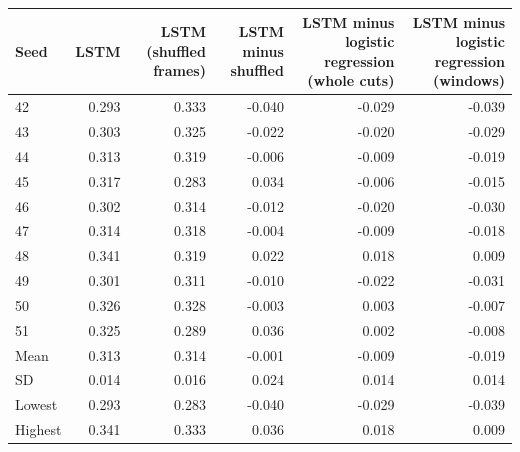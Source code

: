 \begin{tabular}{lrrrrr}
\toprule
Seed & LSTM & LSTM (shuffled frames) & LSTM minus shuffled & LSTM minus logistic regression (whole cuts) & LSTM minus logistic regression (windows) \\
\midrule
42 & 0.293 & 0.333 & -0.040 & -0.029 & -0.039 \\
43 & 0.303 & 0.325 & -0.022 & -0.020 & -0.029 \\
44 & 0.313 & 0.319 & -0.006 & -0.009 & -0.019 \\
45 & 0.317 & 0.283 & 0.034 & -0.006 & -0.015 \\
46 & 0.302 & 0.314 & -0.012 & -0.020 & -0.030 \\
47 & 0.314 & 0.318 & -0.004 & -0.009 & -0.018 \\
48 & 0.341 & 0.319 & 0.022 & 0.018 & 0.009 \\
49 & 0.301 & 0.311 & -0.010 & -0.022 & -0.031 \\
50 & 0.326 & 0.328 & -0.003 & 0.003 & -0.007 \\
51 & 0.325 & 0.289 & 0.036 & 0.002 & -0.008 \\
Mean & 0.313 & 0.314 & -0.001 & -0.009 & -0.019 \\
SD & 0.014 & 0.016 & 0.024 & 0.014 & 0.014 \\
Lowest & 0.293 & 0.283 & -0.040 & -0.029 & -0.039 \\
Highest & 0.341 & 0.333 & 0.036 & 0.018 & 0.009 \\
\bottomrule
\end{tabular}
